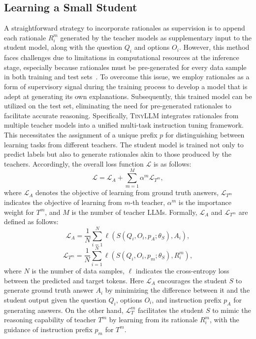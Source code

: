 \documentclass[sigconf,nonacm]{acmart}
\newcommand{\ours}{\textsc{TinyLLM}\xspace}
\begin{document}
\subsection{Learning a Small Student}
A straightforward strategy to incorporate rationales as supervision is to append each rationale \(R_i^m\) generated by the teacher models as supplementary input to the student model, along with the question \(Q_i\) and options \(O_i\). However, this method faces challenges due to limitations in computational resources at the inference stage, especially because rationales must be pre-generated for every data sample in both training and test sets~\cite{wang2022pinto}. To overcome this issue, we employ rationales as a form of supervisory signal during the training process to develop a model that is adept at generating its own explanations. Subsequently, this trained model can be utilized on the test set, eliminating the need for pre-generated rationales to facilitate accurate reasoning. Specifically, \ours integrates rationales from multiple teacher models into a unified multi-task instruction tuning framework. This necessitates the assignment of a unique prefix \(p\) for distinguishing between learning tasks from different teachers. The student model is trained not only to predict labels but also to generate rationales akin to those produced by the teachers. Accordingly, the overall loss function $\mathcal{L}$ is as follows:
\begin{equation}
\mathcal{L} = \mathcal{L}_A + \sum_{m=1}^{M}\alpha^m\mathcal{L}_{T^m}, 
\label{eq:total_loss}
\end{equation}
where \(\mathcal{L}_A\) denotes the objective of learning from ground truth answers, $\mathcal{L}_{T^m}$ indicates the objective of learning from $m$-th teacher, $\alpha^m$ is the importance weight for $T^m$, and $M$ is the number of teacher LLMs. Formally, $\mathcal{L}_A$ and $\mathcal{L}_{T^m}$ are defined as follows:
\begin{equation}
\mathcal{L}_A = \frac{1}{N} \sum_{i=1}^{N} \ell(S(Q_i, O_i, p_A; \theta_S), A_i),
\end{equation}
\begin{equation}
    \mathcal{L}_{T^m} = \frac{1}{N} \sum_{i=1}^{N} \ell(S(Q_i, O_i, p_m; \theta_S), R_i^m),
\end{equation}
where $N$ is the number of data samples, $\ell$ indicates the cross-entropy loss between the predicted and target tokens. Here $\mathcal{L}_A$ encourages the student $S$ to generate ground truth answer $A_i$ by minimizing the difference between it and the student output given the question $Q_i$, options $O_i$, and instruction prefix $p_A$ for generating answers. On the other hand, $\mathcal{L}_T^m$ facilitates the student $S$ to mimic the reasoning capability of teacher $T^m$ by learning from its rationale $R_i^m$, with the guidance of instruction prefix $p_m$ for $T^m$.
\end{document}
